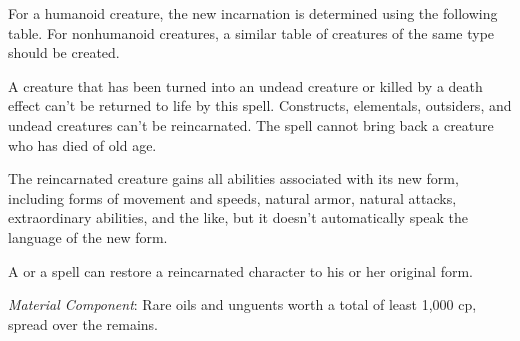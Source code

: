 {	For a humanoid creature, the new incarnation is determined using the following table. For nonhumanoid creatures, a similar table of creatures of the same type should be created.

	A creature that has been turned into an undead creature or killed by a death effect can't be returned to life by this spell.  Constructs, elementals, outsiders, and undead creatures can't be reincarnated. The spell cannot bring back a creature who has died of old age.


	The reincarnated creature gains all abilities associated with its new form, including forms of movement and speeds, natural armor, natural attacks, extraordinary abilities, and the like, but it doesn't automatically speak the language of the new form.

	A  or a  spell can restore a reincarnated character to his or her original form.

	\textit{Material Component}:
	Rare oils and unguents worth a total of least 1,000 cp, spread over the remains.

}
